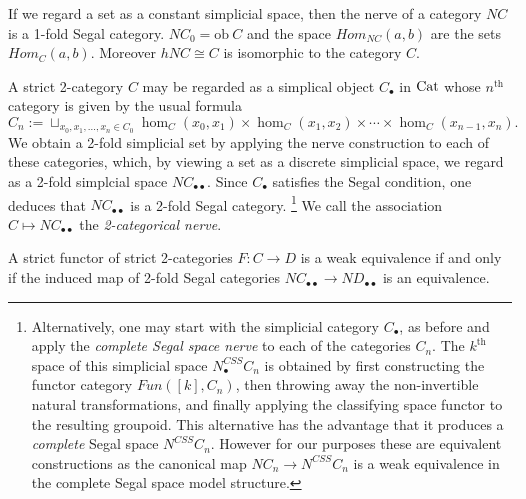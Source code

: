 \documentclass{amsart}
\begin{document}
\begin{example}
	If we regard a set as a constant simplicial space, then the nerve of a category $NC$ is a 1-fold Segal category. $NC_0 = \textrm{ob}\ C$ and the space $Hom_{NC}(a,b)$ are the sets $Hom_C(a,b)$. Moreover $hNC \cong C$ is isomorphic to the category $C$. 
\end{example}

\begin{example}
	A strict 2-category $C$ may be regarded as a simplical object $C_\bullet$ in $\mathrm{Cat}$ whose $n^\textrm{th}$ category is given by the usual formula
	\begin{equation*}
		C_n := \sqcup_{x_0, x_1, \dots, x_n \in C_0} \hom_C(x_0, x_1) \times \hom_C(x_1, x_2) \times \cdots \times \hom_C(x_{n-1}, x_n).
	\end{equation*}
	We obtain a 2-fold simplicial set by applying the nerve construction to each of these categories, which, by viewing a set as a discrete simplicial space, we regard as a 2-fold simplcial space $NC_{\bullet \bullet}$. Since $C_\bullet$ satisfies the Segal condition, one deduces that $NC_{\bullet \bullet}$ is a 2-fold Segal category. 
	\footnote{Alternatively, one may start with the simplicial category $C_\bullet$, as before and apply the {\em complete Segal space nerve} to each of the categories $C_n$. The $k^\text{th}$ space of this simplicial space $N^{CSS}_\bullet C_n$ is obtained by first constructing the functor category $Fun([k], C_n)$, then throwing away the non-invertible natural transformations, and finally applying the classifying space functor to the resulting groupoid. This alternative has the advantage that it produces a {\em complete} Segal space $N^{CSS} C_n$. However for our purposes these are equivalent constructions as the canonical map $N C_n \to N^{CSS} C_n$ is a weak equivalence in the complete Segal space model structure. 
	} We call the association $C \mapsto NC_{\bullet \bullet}$ the {\em 2-categorical nerve}. 
\end{example}

\begin{lemma} \label{lma:2catnervereflectsequiv}
	A strict functor of strict 2-categories $F: C \to D$ is a weak equivalence if and only if the induced map of 2-fold Segal categories $NC_{\bullet \bullet} \to ND_{\bullet \bullet}$ is an equivalence. 
\end{lemma}
\end{document}
